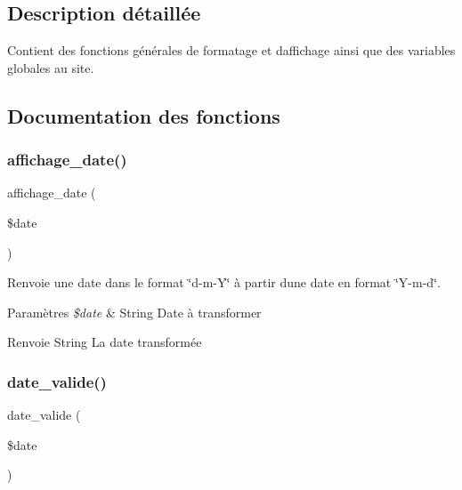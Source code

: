 \subsection{Description détaillée}
Contient des fonctions générales de formatage et d\textquotesingle{}affichage ainsi que des variables globales au site. 



\subsection{Documentation des fonctions}
\mbox{\label{variables_8php_a34f898a3defe62bd4091aa4a4866eb05}} 
\subsubsection{\texorpdfstring{affichage\+\_\+date()}{affichage\_date()}}
{\footnotesize\ttfamily affichage\+\_\+date (\begin{DoxyParamCaption}\item[{}]{\$date }\end{DoxyParamCaption})}



Renvoie une date dans le format \char`\"{}d-\/m-\/\+Y\char`\"{} à partir d\textquotesingle{}une date en format \char`\"{}\+Y-\/m-\/d\char`\"{}. 


\begin{DoxyParams}{Paramètres}
{\em \$date} & String Date à transformer \\
\hline
\end{DoxyParams}
\begin{DoxyReturn}{Renvoie}
String La date transformée 
\end{DoxyReturn}
\mbox{\label{variables_8php_a2daec8f26b14f5950d5ab0cff23445f8}} 
\subsubsection{\texorpdfstring{date\+\_\+valide()}{date\_valide()}}
{\footnotesize\ttfamily date\+\_\+valide (\begin{DoxyParamCaption}\item[{}]{\$date }\end{DoxyParamCaption})}



